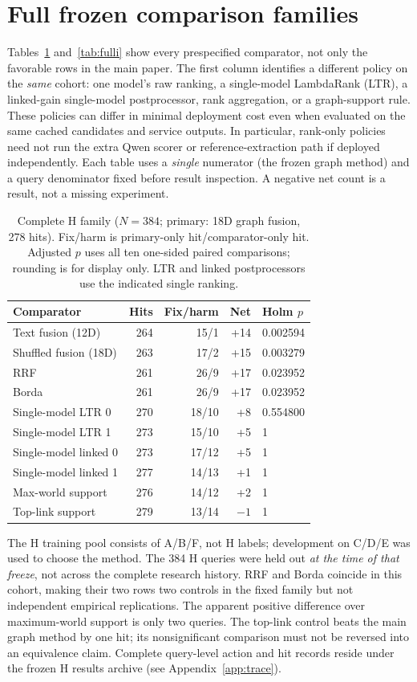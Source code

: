 \section{Full frozen comparison families}\label{app:families}
Tables~\ref{tab:fullh} and~\ref{tab:fulli} show every prespecified
comparator, not only the favorable rows in the main paper. The first column
identifies a different policy on the \emph{same} cohort: one model's raw
ranking, a single-model LambdaRank (LTR), a linked-gain single-model
postprocessor, rank aggregation, or a graph-support rule. These policies
can differ in minimal deployment cost even when evaluated on the same
cached candidates and service outputs. In particular, rank-only policies
need not run the extra Qwen scorer or reference-extraction path if deployed
independently. Each table uses a \emph{single} numerator (the frozen graph
method) and a query denominator fixed before result inspection. A negative
net count is a result, not a missing experiment.
\begin{table}[h]
\centering
\caption{Complete H family ($N=384$; primary: 18D graph fusion, 278 hits).
Fix/harm is primary-only hit/comparator-only hit. Adjusted $p$ uses all ten
one-sided paired comparisons; rounding is for display only. LTR and linked
postprocessors use the indicated single ranking.}
\label{tab:fullh}\small
\begin{tabular}{lrrrl}
\toprule
Comparator & Hits & Fix/harm & Net & Holm $p$ \\
\midrule
Text fusion (12D) & 264 & 15/1 & +14 & 0.002594 \\
Shuffled fusion (18D) & 263 & 17/2 & +15 & 0.003279 \\
RRF & 261 & 26/9 & +17 & 0.023952 \\
Borda & 261 & 26/9 & +17 & 0.023952 \\
Single-model LTR 0 & 270 & 18/10 & +8 & 0.554800 \\
Single-model LTR 1 & 273 & 15/10 & +5 & 1 \\
Single-model linked 0 & 273 & 17/12 & +5 & 1 \\
Single-model linked 1 & 277 & 14/13 & +1 & 1 \\
Max-world support & 276 & 14/12 & +2 & 1 \\
Top-link support & 279 & 13/14 & $-1$ & 1 \\
\bottomrule
\end{tabular}
\end{table}

The H training pool consists of A/B/F, not H labels; development on C/D/E
was used to choose the method. The 384 H queries were held out \emph{at
the time of that freeze}, not across the complete research history. RRF
and Borda coincide in this cohort, making their two rows two controls in
the fixed family but not independent empirical replications. The apparent
positive difference over maximum-world support is only two queries. The
top-link control beats the main graph method by one hit; its nonsignificant
comparison must not be reversed into an equivalence claim. Complete
query-level action and hit records reside under the frozen H results
archive (see Appendix~\ref{app:trace}).

